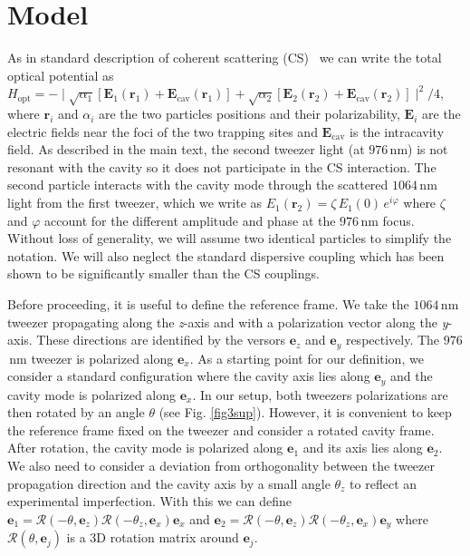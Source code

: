 \documentclass[aps,PRA,%
 amsmath,amssymb,
singlecolumn,
notitlepage,superscriptaddress,groupedaddress]{revtex4}
\begin{document}
\section{Model}
As in standard description of coherent scattering (CS)~\cite{Vuletic2000Laser,novotny_CS_2019,Delic_CS_2019,toros2020Quantum,toros2021Coherent} we can write the total optical potential as $H_{\text{opt}}=- \mid \sqrt{\alpha_1} [\mathbf{E}_{1}(\mathbf{r}_1)+\mathbf{E}_{\text{cav}}(\mathbf{r}_1)]+\sqrt{\alpha_2}[\mathbf{E}_{2}(\mathbf{r}_2)+\mathbf{E}_{\text{cav}}(\mathbf{r}_2)]\mid^2/4$, where $\mathbf{r}_i$ and $\alpha_i$ are the two particles positions and their polarizability, $\mathbf{E}_i$ are the electric fields near the foci of the two trapping sites and $\mathbf{E}_\text{cav}$ is the intracavity field. As described in the main text, the second tweezer light (at $976$\,nm) is not resonant with the cavity so it does not participate in the CS interaction. The second particle interacts with the cavity mode through the scattered $1064$\,nm light from the first tweezer, which we write as $E_1(\mathbf{r}_2)=\zeta\,E_1(0)\,e^{i\varphi}$ where $\zeta$ and $\varphi$ account for the different amplitude and phase at the $976$\,nm focus. Without loss of generality, we will assume two identical particles to simplify the notation. We will also neglect the standard dispersive coupling which has been shown to be significantly smaller than the CS couplings. 



Before proceeding, it is useful to define the reference frame. We take the $1064$\,nm tweezer propagating along the \textit{z}-axis and with a polarization vector along the \textit{y}-axis. These directions are identified by the versors $\textbf{e}_z$ and $\textbf{e}_y$ respectively. The $976$\,nm tweezer is polarized along $\textbf{e}_x$. As a starting point for our definition, we consider a standard configuration where the cavity axis lies along $\textbf{e}_y$ and the cavity mode is polarized along $\textbf{e}_x$. In our setup, both tweezers polarizations are then rotated by an angle $\theta$ (see Fig. \ref{fig3sup}). However, it is convenient to keep the reference frame fixed on the tweezer and consider a rotated cavity frame. After rotation, the cavity mode is polarized along $\mathbf{e}_1$ and its axis lies along $\textbf{e}_2$. We also need to consider a deviation from orthogonality between the tweezer propagation direction and the cavity axis by a small angle $\theta_z$ to reflect an experimental imperfection. With this we can define $\mathbf{e}_1=\mathcal{R}(-\theta,\mathbf{e}_z)\mathcal{R}(-\theta_z,\mathbf{e}_x)\mathbf{e}_x$ and $\mathbf{e}_2=\mathcal{R}(-\theta,\mathbf{e}_z)\mathcal{R}(-\theta_z,\mathbf{e}_x)\mathbf{e}_y$ where $\mathcal{R}(\theta,\mathbf{e}_j)$ is a 3D rotation matrix around $\mathbf{e}_j$.
\end{document}
